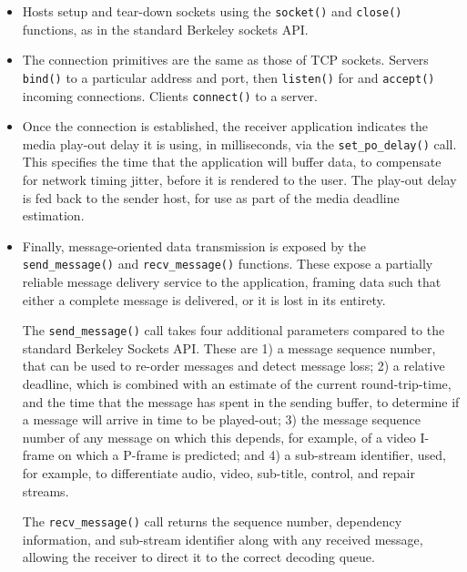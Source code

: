 \documentclass[10pt]{sig-alternate-05-2015}
\newcommand{\todo}[1]{\textbf{\textcolor{red}{To do -- #1}}}
\begin{document}
\begin{itemize}
  \item Hosts setup and tear-down sockets using the \texttt{socket()}
    and \texttt{close()} functions, as in the standard Berkeley sockets
    API.

  \item The connection primitives are the same as those of TCP sockets.
    Servers \texttt{bind()} to a particular address and port, then
    \texttt{listen()} for and \texttt{accept()} incoming connections.
    Clients \texttt{connect()} to a server.

   \item Once the connection is established, the receiver application
     indicates the media play-out delay it is using, in milliseconds, via
     the \texttt{set\_po\_delay()} call. This specifies the time that the
     application will buffer data, to compensate for network timing jitter,
     before it is rendered to the user. The play-out delay is fed back to
     the sender host, for use as part of the media deadline estimation.

  \item Finally, message-oriented data transmission is exposed by the
    \texttt{send\_message()} and \texttt{recv\_message()} functions.
    These expose a partially reliable message delivery service to the
    application, framing data such that either a complete message is
    delivered, or it is lost in its entirety.

    The \texttt{send\_message()} call takes four additional parameters
    compared to the standard Berkeley Sockets API. These are 1) a
    message sequence number, that can be used to re-order messages and
    detect message loss; 2) a relative deadline, which is combined
    with an estimate of the current round-trip-time, and the time that
    the message has spent in the sending buffer, to determine if a
    message will arrive in time to be played-out; 3) the message
    sequence number of any message on which this depends, for example,
    of a video I-frame on which a P-frame is predicted; and 4) a
    sub-stream identifier, used, for example, to differentiate audio,
    video, sub-title, control, and repair streams.

    The \texttt{recv\_message()} call returns the sequence number,
    dependency information, and sub-stream identifier along with any
    received message, allowing the receiver to direct it to the correct
    decoding queue.


\end{itemize}
\end{document}
